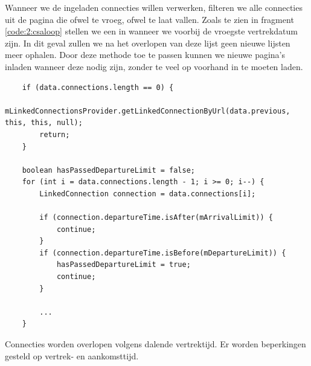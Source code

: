 Wanneer we de ingeladen connecties willen verwerken, filteren we alle connecties uit de pagina die ofwel te vroeg, ofwel te laat vallen. Zoals te zien in fragment \ref{code:2:csaloop} stellen we een  in wanneer we voorbij de vroegste vertrekdatum zijn. In dit geval zullen we na het overlopen van deze lijst geen nieuwe lijsten meer ophalen. Door deze methode toe te passen kunnen we nieuwe pagina's inladen wanneer deze nodig zijn, zonder te veel op voorhand in te moeten laden.

\begin{code}[h]
\begin{verbatim}
	if (data.connections.length == 0) {
		mLinkedConnectionsProvider.getLinkedConnectionByUrl(data.previous, this, this, null);
		return;
	}
	
	boolean hasPassedDepartureLimit = false;
	for (int i = data.connections.length - 1; i >= 0; i--) {
		LinkedConnection connection = data.connections[i];
		
		if (connection.departureTime.isAfter(mArrivalLimit)) {
			continue;
		}
		if (connection.departureTime.isBefore(mDepartureLimit)) {
			hasPassedDepartureLimit = true;
			continue;
		}
		
		...
	}
	\end{verbatim}
			\caption[CSA: Overlopen van connecties]{Connecties worden overlopen volgens dalende vertrektijd. Er worden beperkingen gesteld op vertrek- en aankomsttijd.}
	\label{code:2:csaloop}
\end{code}

